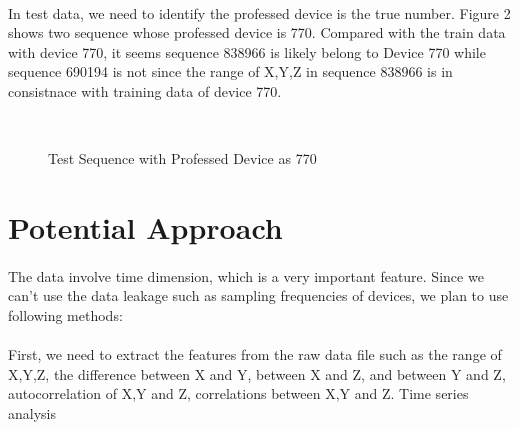 \documentclass{article}
\begin{document}
	\paragraph{}In test data, we need to identify the professed device is the true number. Figure 2 shows two sequence whose professed device is 770. Compared with the train data with device 770, it seems sequence 838966 is likely belong to Device 770 while sequence 690194 is not since the range of X,Y,Z in sequence 838966 is in consistnace with training data of device 770. 
	\begin{figure}
		\centering
		\\
		\caption{Test Sequence with Professed Device as 770}
	\end{figure}
	
	

	
	\section{Potential Approach} %
	\label{sec:potential_approach}
	\paragraph{}The data involve time dimension, which is a very important feature. Since we can't use the data leakage such as sampling frequencies of devices, we plan to use following methods:
	
	
	\paragraph{} First, we need to extract the features from the raw data file such as the range of X,Y,Z, the difference between X and Y, between X and Z, and between Y and Z, autocorrelation of X,Y and Z, correlations between X,Y and Z.  Time series analysis 
	
\end{document}
